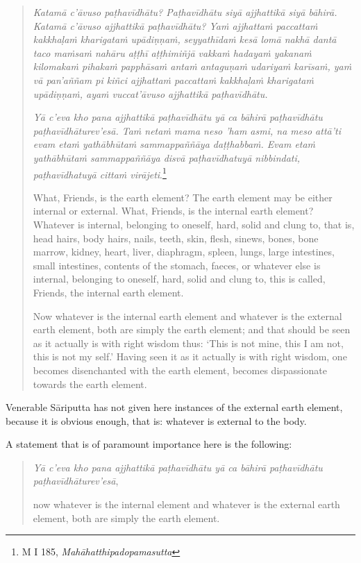 \begin{quote}
\emph{Katamā c'āvuso paṭhavīdhātu? Paṭhavīdhātu siyā ajjhattikā siyā bāhirā. Katamā c'āvuso ajjhattikā paṭhavīdhātu? Yaṁ ajjhattaṁ paccattaṁ kakkhaḷaṁ kharigataṁ upādiṇṇaṁ, seyyathīdaṁ kesā lomā nakhā dantā taco maṁsaṁ nahāru aṭṭhī aṭṭhimiñjā vakkaṁ hadayaṁ yakanaṁ kilomakaṁ pihakaṁ papphāsaṁ antaṁ antaguṇaṁ udariyaṁ karīsaṁ, yaṁ vā pan'aññam pi kiñci ajjhattaṁ paccattaṁ kakkhaḷaṁ kharigataṁ upādiṇṇaṁ, ayaṁ vuccat'āvuso ajjhattikā paṭhavīdhātu.}

\emph{Yā c'eva kho pana ajjhattikā paṭhavīdhātu yā ca bāhirā paṭhavīdhātu paṭhavīdhāturev'esā. Taṁ netaṁ mama neso 'ham asmi, na meso attā'ti evam etaṁ yathābhūtaṁ sammappaññāya daṭṭhabbaṁ. Evam etaṁ yathābhūtaṁ sammappaññāya disvā paṭhavīdhatuyā nibbindati, paṭhavīdhatuyā cittaṁ virājeti}.\footnote{M I 185, \emph{Mahāhatthipadopamasutta}}

What, Friends, is the earth element? The earth element may be either internal or external. What, Friends, is the internal earth element? Whatever is internal, belonging to oneself, hard, solid and clung to, that is, head hairs, body hairs, nails, teeth, skin, flesh, sinews, bones, bone marrow, kidney, heart, liver, diaphragm, spleen, lungs, large intestines, small intestines, contents of the stomach, faeces, or whatever else is internal, belonging to oneself, hard, solid and clung to, this is called, Friends, the internal earth element.

Now whatever is the internal earth element and whatever is the external earth element, both are simply the earth element; and that should be seen as it actually is with right wisdom thus: `This is not mine, this I am not, this is not my self.' Having seen it as it actually is with right wisdom, one becomes disenchanted with the earth element, becomes dispassionate towards the earth element.
\end{quote}

Venerable Sāriputta has not given here instances of the external earth element, because it is obvious enough, that is: whatever is external to the body.

A statement that is of paramount importance here is the following:

\begin{quote}
\emph{Yā c'eva kho pana ajjhattikā paṭhavīdhātu yā ca bāhirā paṭhavīdhātu paṭhavīdhāturev'esā},

now whatever is the internal element and whatever is the external earth element, both are simply the earth element.
\end{quote}

